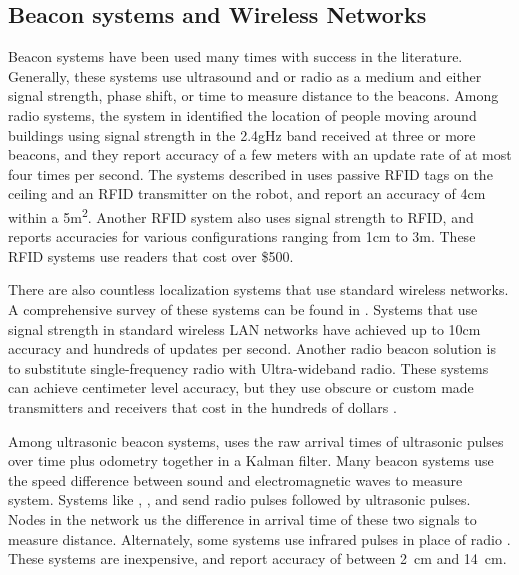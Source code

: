 \documentclass{article}
\begin{document}
  \subsection{Beacon systems and Wireless Networks}

    Beacon systems have been used many times with success in the literature. Generally, these systems use ultrasound and or radio as a medium and either signal strength, phase shift, or time to measure distance to the beacons. Among radio systems, the system in \cite{bahl_radar:_2000} identified the location of people moving around buildings using signal strength in the 2.4gHz band received at three or more beacons, and they report accuracy of a few meters with an update rate of at most four times per second. The systems described in \cite{digiampaolo_mobile_2014} uses passive RFID tags on the ceiling and an RFID transmitter on the robot, and report an accuracy of 4\si{\centi\meter} within a 5\si{\square\meter}. Another RFID system \cite{saab_standalone_2011} also uses signal strength to RFID, and reports accuracies for various configurations ranging from 1\si{\centi\meter} to 3\si{\meter}. These RFID systems use readers that cost over \$500.

    There are also countless localization systems that use standard wireless networks. A comprehensive survey of these systems can be found in \cite{liu_survey_2007}. Systems that use signal strength in standard wireless LAN networks have achieved up to 10\si{\centi\meter} accuracy and hundreds of updates per second. Another radio beacon solution is to substitute single-frequency radio with Ultra-wideband radio. These systems can achieve centimeter level accuracy, but they use obscure or custom made transmitters and receivers that cost in the hundreds of dollars \cite{zebra_dart_2017} \cite{pozyx_pozyx_2017}.

    Among ultrasonic beacon systems, \cite{kleeman_optimal_1992} uses the raw arrival times of ultrasonic pulses over time plus odometry together in a Kalman filter. Many beacon systems use the speed difference between sound and electromagnetic waves to measure system. Systems like \cite{smith_tracking_2004}, \cite{ward_new_1997}, and \cite{kim_advanced_2008} send radio pulses followed by ultrasonic pulses. Nodes in the network us the difference in arrival time of these two signals to measure distance. Alternately, some systems use infrared pulses in place of radio \cite{ghidary_new_1999} \cite{yucel_development_2012}. These systems are inexpensive, and report accuracy of between \SI{2}{\centi\meter} and \SI{14}{\centi\meter}.
\end{document}
